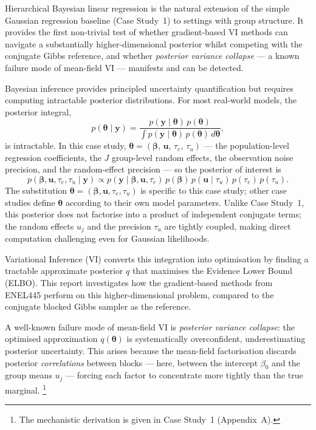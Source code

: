 \documentclass[11pt,a4paper]{article}
\begin{document}
Hierarchical Bayesian linear regression is the natural extension of the simple
Gaussian regression baseline (Case Study~1) to settings with group structure.
It provides the first non-trivial test of whether gradient-based VI methods can
navigate a substantially higher-dimensional posterior whilst competing with the conjugate
Gibbs reference, and whether \emph{posterior variance collapse} --- a known failure
mode of mean-field VI --- manifests and can be detected.

Bayesian inference provides principled uncertainty quantification but requires computing
intractable posterior distributions. For most real-world models, the posterior integral,
\begin{equation*}
    p(\bm{\theta} \mid \bm{y}) = \frac{p(\bm{y} \mid \bm{\theta})\,p(\bm{\theta})}
    {\displaystyle\int p(\bm{y} \mid \bm{\theta})\,p(\bm{\theta})\, d\bm{\theta}},
\end{equation*}
is intractable.
In this case study,
$\bm{\theta} = (\bm{\beta},\,\mathbf{u},\,\tau_e,\,\tau_u)$
--- the population-level regression coefficients, the $J$ group-level random effects,
the observation noise precision, and the random-effect precision --- so the posterior
of interest is
\begin{equation*}
    p(\bm{\beta},\mathbf{u},\tau_e,\tau_u \mid \mathbf{y})
    \propto p(\mathbf{y}\mid\bm{\beta},\mathbf{u},\tau_e)\,
             p(\bm{\beta})\,p(\mathbf{u}\mid\tau_u)\,
             p(\tau_e)\,p(\tau_u).
\end{equation*}
The substitution $\bm{\theta} = (\bm{\beta},\mathbf{u},\tau_e,\tau_u)$ is specific to
this case study; other case studies define $\bm{\theta}$ according to their own model
parameters.
Unlike Case Study~1, this posterior does not factorise into a product of independent
conjugate terms; the random effects $u_j$ and the precision $\tau_u$ are tightly coupled,
making direct computation challenging even for Gaussian likelihoods.

Variational Inference (VI) converts this integration into optimisation by finding
a tractable approximate posterior $q$ that maximises the Evidence Lower Bound (ELBO).
This report investigates how the gradient-based methods from ENEL445 perform on this
higher-dimensional problem, compared to the conjugate blocked Gibbs sampler as the
reference.

A well-known failure mode of mean-field VI is \emph{posterior variance collapse}:
the optimised approximation $q(\bm{\theta})$ is systematically overconfident,
underestimating posterior uncertainty.
This arises because the mean-field factorisation discards posterior \emph{correlations}
between blocks --- here, between the intercept $\beta_0$ and the group means $u_j$
--- forcing each factor to concentrate more tightly than the true marginal.%
\footnote{The mechanistic derivation is given in Case Study~1 (Appendix~A).}
\end{document}
